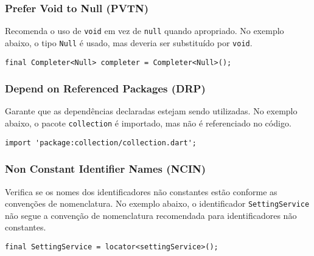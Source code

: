 \documentclass[12pt]{article}
\begin{document}
\subsubsection{Prefer Void to Null (PVTN)}
Recomenda o uso de \texttt{void} em vez de \texttt{null} quando apropriado. No exemplo abaixo, o tipo \texttt{Null} é usado, mas deveria ser substituído por \texttt{void}.

\begin{tcolorbox}[codeSnippetStyle={admin-portal/lib/ui/auth/login\_view.dart}]
\begin{verbatim}
final Completer<Null> completer = Completer<Null>();
\end{verbatim}
\end{tcolorbox}


\subsubsection{Depend on Referenced Packages (DRP)}
Garante que as dependências declaradas estejam sendo utilizadas. No exemplo abaixo, o pacote \texttt{collection} é importado, mas não é referenciado no código.

\begin{tcolorbox}[codeSnippetStyle={openreads/lib/ui/statistics\_screen/widgets/read\_stats\_by\_month.dart}]
\begin{verbatim}
import 'package:collection/collection.dart';
\end{verbatim}
\end{tcolorbox}


\subsubsection{Non Constant Identifier Names (NCIN)}
Verifica se os nomes dos identificadores não constantes estão conforme as convenções de nomenclatura. No exemplo abaixo, o identificador \texttt{SettingService} não segue a convenção de nomenclatura recomendada para identificadores não constantes.

\begin{tcolorbox}[codeSnippetStyle={flutter-tunein/lib/pages/library/tracks.page.dart}]
\begin{verbatim}
final SettingService = locator<settingService>();
\end{verbatim}
\end{tcolorbox}
\end{document}
